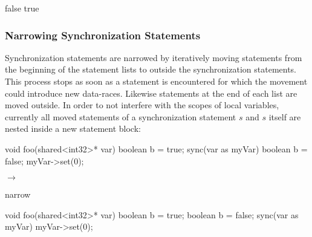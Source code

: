 \begin{algorithmic}
\State {}
 
    \State \Return false
  \EndIf
\EndFor
\State \Return true
\EndFunction
\end{algorithmic}

\subsubsection{Narrowing Synchronization Statements}
Synchronization statements are narrowed by iteratively moving statements from the beginning of the statement lists to outside the synchronization statements. This process stops as soon as a statement is encountered for which the movement could introduce new data-races. Likewise statements at the end of each list are moved outside. In order to not interfere with the scopes of local variables, currently all moved statements of a synchronization statement $s$ and $s$ itself are nested inside a new statement block:

\begin{minipage}{0.3\textwidth}
\begin{ccode}
void foo(shared<int32>* var) {
  boolean b = true;
  sync(var as myVar) {
    boolean b = false;
    myVar->set(0);
  }
}
\end{ccode}
\end{minipage}
\begin{minipage}{0.2\textwidth}
\begin{center}
$\longrightarrow$

narrow
\end{center}
\end{minipage}
\begin{minipage}{0.3\textwidth}
\begin{ccode}
void foo(shared<int32>* var) {
  boolean b = true;
  {
    boolean b = false;
    sync(var as myVar) { myVar->set(0); }
  }
}
\end{ccode}
\end{minipage}

